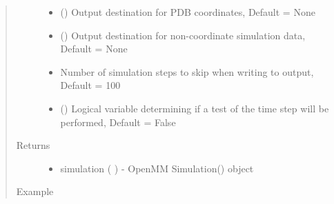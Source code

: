 \documentclass[letterpaper,12pt,english,openany,oneside]{sphinxmanual}
\begin{document}
\begin{fulllineitems}
\begin{quote}
\begin{description}
\begin{itemize}
\item {} 
 () \textendash{} Output destination for PDB coordinates, Default = None

\item {} 
 () \textendash{} Output destination for non-coordinate simulation data, Default = None

\item {} 
 \textendash{} Number of simulation steps to skip when writing to output, Default = 100

\item {} 
 () \textendash{} Logical variable determining if a test of the time step will be performed, Default = False

\end{itemize}

\item[{Returns}] \leavevmode
\begin{itemize}
\item {} 
simulation (  ) - OpenMM Simulation() object

\end{itemize}


\item[{Example}] \leavevmode
\end{description}\end{quote}


\end{fulllineitems}
\end{document}
